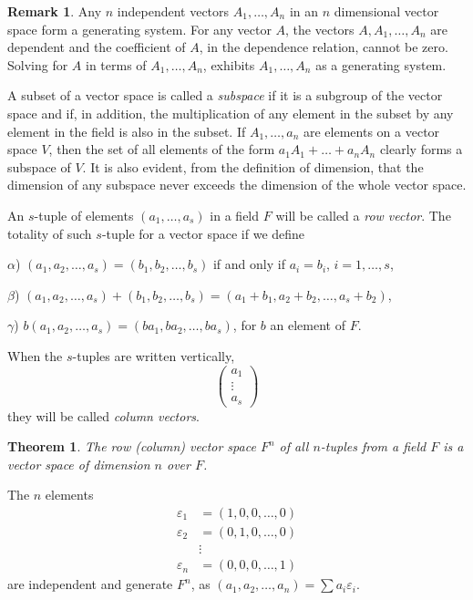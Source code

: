 \documentclass[10pt,leqno]{article}
\newtheorem{theo}{Theorem}
\theoremstyle{definition}
\newtheorem*{rema}{Remark}
\def\eps{\varepsilon}
\begin{document}
\begin{rema}
Any $n$ independent vectors $A_1, \ldots, A_n$ in an $n$ dimensional vector space form a generating system.
For any vector $A$, the vectors $A, A_1, \ldots, A_n$ are dependent and the coefficient of $A$, in the dependence relation, cannot be zero.
Solving for $A$ in terms of $A_1, \ldots, A_n$, exhibits $A_1, \ldots, A_n$ as a generating system.
\end{rema}


A subset of a vector space is called a \emph{subspace} if it is a subgroup of the vector space and if, in addition, the multiplication of any element in the subset by any element in the field is also in the subset.
If $A_1, \ldots, a_n$ are elements on a vector space $V$, then the set of all elements of the form $a_1 A_1 + \ldots + a_n A_n$ clearly forms a subspace of $V$.
It is also evident, from the definition of dimension, that the dimension of any subspace never exceeds the dimension of the whole vector space.

An $s$-tuple of elements $(a_1, \ldots, a_s)$ in a field $F$ will be called a \emph{row vector}.
The totality of such $s$-tuple for a vector space if we define

$\alpha$)
$(a_1, a_2, \ldots, a_s) = (b_1, b_2, \ldots, b_s)$ if and only if $a_i = b_i$, $i = 1, \ldots, s$,

$\beta$)
$(a_1, a_2, \ldots, a_s) + (b_1, b_2, \ldots, b_s)
= (a_1 + b_1, a_2 + b_2, \ldots, a_s + b_2)$,

$\gamma$)
$b (a_1, a_2, \ldots, a_s) = (ba_1, ba_2, \ldots, ba_s)$, for $b$ an element of $F$.

When the $s$-tuples are written vertically,
\[
\begin{pmatrix}
a_1 \\ \vdots \\ a_s
\end{pmatrix}
\]
they will be called \emph{column vectors}.


\begin{theo}
\label{theo:th}
The row (column) vector space $F^n$ of all $n$-tuples from a field $F$ is a vector space of dimension $n$ over $F$.
\end{theo}

The $n$ elements
\begin{align*}
\eps_1 &= (1, 0, 0, \ldots, 0)
\\
\eps_2 &= (0, 1, 0, \ldots, 0)
\\
       & \vdots 
\\
\eps_n &= (0, 0, 0, \ldots, 1)
\end{align*}
are independent and generate $F^n$, as
$(a_1, a_2, \ldots, a_n) = \sum a_i \eps_i$.
\end{document}
